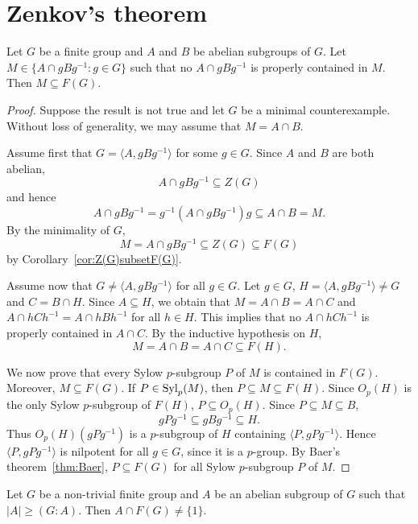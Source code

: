 \section{Zenkov's theorem}

\begin{theorem}[Zenkov]
    \label{thm:Zenkov}
    Let $G$ be a finite group and $A$ and $B$ be abelian subgroups of $G$. Let
    $M\in\{A\cap gBg^{-1}:g\in G\}$ such that no $A\cap gBg^{-1}$ is properly
    contained in $M$. Then $M\subseteq F(G)$.
\end{theorem}

\begin{proof}
    Suppose the result is not true and let $G$ be a minimal counterexample. 
	Without loss of generality, we may assume that $M=A\cap B$. 

	Assume first that $G=\langle A,gBg^{-1}\rangle$ for some $g\in G$. Since $A$
	and $B$ are both abelian, 
 \[
 A\cap gBg^{-1}\subseteq Z(G)
 \]
 and hence 
	\[
		A\cap gBg^{-1}=g^{-1}(A\cap gBg^{-1})g\subseteq A\cap B=M.
	\]
	By the minimality of $G$, 
    \[
    M=A\cap gBg^{-1}\subseteq Z(G)\subseteq F(G)
    \]
	by Corollary~\ref{cor:Z(G)subsetF(G)}.

	Assume now that $G\ne \langle A,gBg^{-1}\rangle$ for all $g\in G$.
	Let $g\in G$, $H=\langle A,gBg^{-1}\rangle\ne G$ and $C=B\cap H$.
	Since $A\subseteq H$, we obtain that 
 	$M=A\cap B=A\cap C$ and 
	$A\cap hCh^{-1}=A\cap hBh^{-1}$
	for all $h\in H$. This implies that no 
	$A\cap hCh^{-1}$ is properly contained in $A\cap C$. 
    By the inductive hypothesis on $H$, 
 	\[
		M=A\cap B=A\cap C\subseteq F(H).
	\]

    We now prove that every Sylow $p$-subgroup $P$ of $M$ is contained in $F(G)$. Moreover, 
    $M\subseteq F(G)$.
	If $P\in\mathrm{Syl}_p(M)$, then $P\subseteq M\subseteq F(H)$. Since $O_p(H)$ is 
    the only Sylow $p$-subgroup of $F(H)$, $P\subseteq O_p(H)$. Since 
	$P\subseteq M\subseteq B$, 
	\[
	gPg^{-1}\subseteq gBg^{-1}\subseteq H.
	\]
	Thus $O_p(H)(gPg^{-1})$ is a $p$-subgroup of $H$ containing 
	$\langle P,gPg^{-1}\rangle$. Hence $\langle P,gPg^{-1}\rangle$
	is nilpotent for all $g\in G$, since it is a $p$-group. By Baer's theorem~\ref{thm:Baer}, 
    $P\subseteq F(G)$ for all Sylow $p$-subgroup $P$ of $M$. 
\end{proof}

\begin{corollary}
	\label{cor:Zenkov}
	Let $G$ be a non-trivial finite group and $A$ be an abelian subgroup of $G$ such that 
 	$|A|\geq(G:A)$. Then $A\cap F(G)\ne\{1\}$.
\end{corollary}

